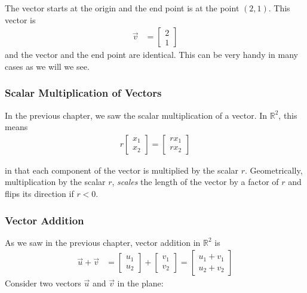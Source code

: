 The vector starts at the origin and the end point is at the point $(2,1)$.  This vector is
%
\begin{align*} \vec{v} & =
\begin{bmatrix}
2 \\1
\end{bmatrix}
\end{align*}
and the vector and the end point are identical.  This can be very handy in many cases as we will we see.



\subsubsection{Scalar Multiplication of Vectors}

In the previous chapter, we saw the scalar multiplication of a vector.  In $\mathbb{R}^2$, this means
%
\begin{align*}
r \begin{bmatrix}
x_1 \\ x_2
\end{bmatrix} = \begin{bmatrix}
r x_1 \\ r x_2
\end{bmatrix}
\end{align*}


in that each component of the vector is multiplied by the scalar $r$.  Geometrically, multiplication by the scalar $r$, \emph{scales} the length of the vector by a factor of $r$ and flips its direction if $r<0$.

\begin{center}
\end{center}

\subsubsection{Vector Addition}

As we saw in the previous chapter, vector addition in $\mathbb{R}^2$ is
%
\begin{align*}
\vec{u} + \vec{v} & = \begin{bmatrix}
u_1 \\ u_2
\end{bmatrix} + \begin{bmatrix}
v_1 \\ v_2
\end{bmatrix} = \begin{bmatrix}
u_1 + v_1 \\ u_2 + v_2
\end{bmatrix}
\end{align*}
Consider two vectors $\vec{u}$ and $\vec{v}$ in the plane:


